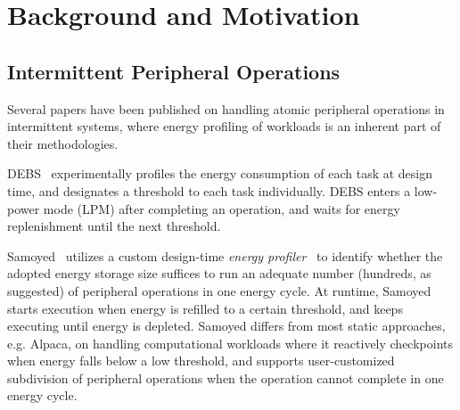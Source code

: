\section{Background and Motivation}




\subsection{Intermittent Peripheral Operations}

Several papers have been published on handling atomic peripheral operations in intermittent systems, where energy profiling of workloads is an inherent part of their methodologies.


DEBS~\cite{gomez2016dynamic} experimentally profiles the energy consumption of each task at design time, and designates a threshold to each task individually.
DEBS enters a low-power mode (LPM) after completing an operation, and waits for energy replenishment until the next threshold. 

Samoyed~\cite{maeng2019supporting} utilizes a custom design-time \textit{energy profiler}~\cite{colin2016energy-interference-free} to identify whether the adopted energy storage size suffices to run an adequate number (hundreds, as suggested) of peripheral operations in one energy cycle. 
At runtime, Samoyed starts execution when energy is refilled to a certain threshold, and keeps executing until energy is depleted. 
Samoyed differs from most static approaches, e.g. Alpaca, on handling computational workloads where it reactively checkpoints when energy falls below a low threshold, and supports user-customized subdivision of peripheral operations when the operation cannot complete in one energy cycle. 

